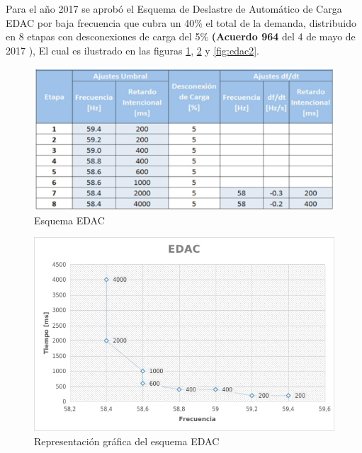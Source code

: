 \documentclass[a5paper]{book}%
\begin{document}
Para el año 2017 se aprobó el Esquema de Deslastre de Automático de
Carga EDAC por baja frecuencia que cubra un 40\% el total de la
demanda, distribuido en 8 etapas con desconexiones de carga del 5\%
\textbf{(Acuerdo 964} del 4 de mayo de 2017 ), El cual es ilustrado en
las figuras \ref{fig:edac}, \ref{fig:edac1} y \ref{fig:edac2}.

\begin{figure}[H]
  \centering
  \caption{Esquema EDAC}
  \label{fig:edac}
  \includegraphics[width=0.8\linewidth]{esquema_edac}
\end{figure}

\begin{figure}[H]
  \centering
  \caption{Representación gráfica del esquema EDAC}
  \label{fig:edac1}
  \includegraphics[width=0.8\linewidth]{EDAC1}
\end{figure}
\end{document}
